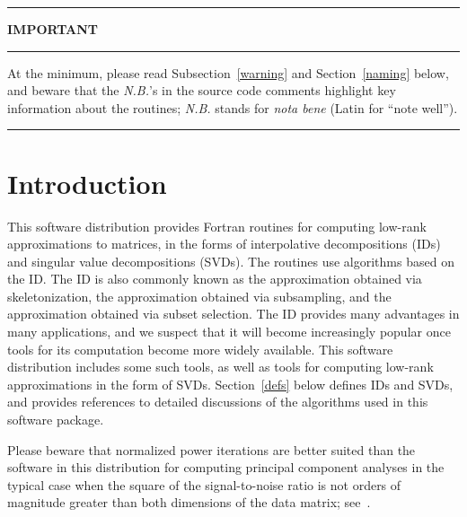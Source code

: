 ﻿\documentclass[letterpaper,12pt]{article}
\begin{document}
\newpage

\tableofcontents

\newpage



\hrule

\medskip

\centerline{\Large \bf IMPORTANT}

\medskip

\hrule

\medskip

\noindent At the minimum, please read Subsection~\ref{warning}
and Section~\ref{naming} below, and beware that the {\it N.B.}'s
in the source code comments highlight key information about the routines;
{\it N.B.} stands for {\it nota bene} (Latin for ``note well'').

\medskip

\hrule

\bigskip



\section{Introduction}

This software distribution provides Fortran routines
for computing low-rank approximations to matrices,
in the forms of interpolative decompositions (IDs)
and singular value decompositions (SVDs).
The routines use algorithms based on the ID.
The ID is also commonly known as
the approximation obtained via skeletonization,
the approximation obtained via subsampling,
and the approximation obtained via subset selection.
The ID provides many advantages in many applications,
and we suspect that it will become increasingly popular
once tools for its computation become more widely available.
This software distribution includes some such tools,
as well as tools for computing low-rank approximations
in the form of SVDs.
Section~\ref{defs} below defines IDs and SVDs,
and provides references to detailed discussions of the algorithms
used in this software package.

Please beware that normalized power iterations are better suited than
the software in this distribution
for computing principal component analyses
in the typical case when the square of the signal-to-noise ratio
is not orders of magnitude greater than both dimensions
of the data matrix; see~\cite{halko-martinsson-tropp}.
\end{document}
